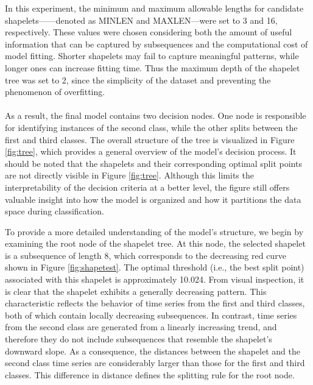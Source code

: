 \noindent In this experiment, the minimum and maximum allowable lengths for candidate shapelets——denoted as MINLEN and MAXLEN—were set to 3 and 16, respectively. These values were chosen considering both the amount of useful information that can be captured by subsequences and the computational cost of model fitting. Shorter shapelets may fail to capture meaningful patterns, while longer ones can increase fitting time. Thus the maximum depth of the shapelet tree was set to 2, since the simplicity of the dataset and preventing the phenomenon of overfitting.\\
\\
As a result, the final model contains two decision nodes. One node is responsible for identifying instances of the second class, while the other splits between the first and third classes. The overall structure of the tree is visualized in Figure \ref{fig:tree}, which provides a general overview of the model’s decision process. It should be noted that the shapelets and their corresponding optimal split points are not directly visible in Figure \ref{fig:tree}. Although this limits the interpretability of the decision criteria at a better level, the figure still offers valuable insight into how the model is organized and how it partitions the data space during classification.\\
\begin{center}
\end{center}
To provide a more detailed understanding of the model’s structure, we begin by examining the root node of the shapelet tree. At this node, the selected shapelet is a subsequence of length 8, which corresponds to the decreasing red curve shown in Figure \ref{fig:shapetest}. The optimal threshold (i.e., the best split point) associated with this shapelet is approximately 10.024. From visual inspection, it is clear that the shapelet exhibits a generally decreasing pattern. This characteristic reflects the behavior of time series from the first and third classes, both of which contain locally decreasing subsequences. In contrast, time series from the second class are generated from a linearly increasing trend, and therefore they do not include subsequences that resemble the shapelet’s downward slope. As a consequence, the distances between the shapelet and the second class time series are considerably larger than those for the first and third classes. This difference in distance defines the splitting rule for the root node.\\

